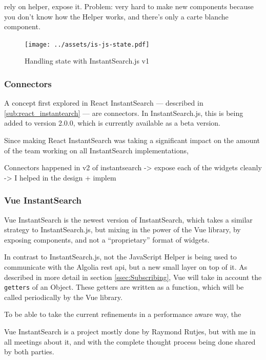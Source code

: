 rely on helper, expose it. Problem: very hard to make new components because you don't know how the Helper works, and there's only a carte blanche component. %

\begin{figure}[H]
  \centering
  \texttt{[image: ../assets/is-js-state.pdf]}
  \caption{Handling state with InstantSearch.js v1}
  \label{figure:is-js-state}
\end{figure} %

\subsubsection{Connectors} %
\label{ssub:instantsearch_js_connectors}

A concept first explored in React InstantSearch --- described in \ref{sub:react_instantearch} --- are connectors. In InstantSearch.js, this is being added to version 2.0.0, which is currently available as a beta version. 

Since making React InstantSearch was taking a significant impact on the amount of the team working on all InstantSearch implementations, %

Connectors happened in v2 of instantsearch
-> expose each of the widgets cleanly
-> I helped in the design + implem %


\subsubsection{Vue InstantSearch} %
\label{ssub:vue_instantsearch}

Vue InstantSearch is the newest version of InstantSearch, which takes a similar strategy to InstantSearch.js, but mixing in the power of the Vue \gls{library}, by exposing components, and not a ``proprietary'' format of widgets.

In contrast to InstantSearch.js, not the JavaScript Helper is being used to communicate with the Algolia \acrshort{rest} \acrshort{api}, but a new small layer on top of it. As described in more detail in section \ref{ssec:Subscribing}, Vue will take in account the {\tt getters} of an Object. These getters are written as a function, which will be called periodically by the Vue \gls{library}. 

To be able to take the current refinements in a performance aware way, the 

Vue InstantSearch is a project mostly done by Raymond Rutjes, but with me in all meetings about it, and with the complete thought process being done shared by both parties.

